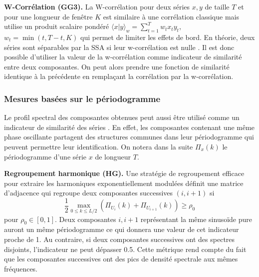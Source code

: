 \documentclass{gretsi}
\begin{document}
\noindent\textbf{W-Corrélation (GG3).}\label{par:GG3} 
    La W-corrélation pour deux séries $x, y$ de taille $T$ et pour une longueur de fenêtre $K$ est similaire à une corrélation classique mais utilise un produit scalaire pondéré $\langle x|y\rangle_w = \sum_{t=1}^Tw_t x_t y_t$, $w_t = \min(t, T-t, K)$ qui permet de limiter les effets de bord.
    En théorie, deux séries sont séparables par la SSA si leur w-corrélation est nulle \cite{Golyandina_10_ssa}.
    Il est donc possible d'utiliser la valeur de la w-corrélation comme indicateur de similarité entre deux composantes.
    On peut alors prendre une fonction de similarité identique à la précédente en remplaçant la corrélation par la w-corrélation.

\subsubsection{Mesures basées sur le périodogramme}\label{ssub:per}
Le profil spectral des composantes obtenues peut aussi être utilisé comme un indicateur de similarité des séries \cite{Golyandina_10_ssa}.
En effet, les composantes contenant une même phase oscillante partagent des structures communes dans leur périodogramme qui peuvent permettre leur identification.
On notera dans la suite $\Pi_x(k)$ le périodogramme d'une série $x$ de longueur $T$.


\noindent\textbf{Regroupement harmonique (HG).}\label{par:HG}
    Une stratégie de regroupement efficace pour extraire les harmoniques exponentiellement modulées \cite{alexandrov_05_auto} définit une matrice d'adjacence qui regroupe deux composantes successives $(i, i+1)$ si 
    \begin{equation}
        \frac{1}{2}\max_{0\le k \le L/2}\left(\Pi_{U_i}(k) + \Pi_{U_{i+1}}(k)\right) \ge \rho_0 
    \end{equation}
    pour $\rho_0\in \left[0, 1\right]$.
    Deux composantes $i, i+1$ représentant la même sinusoïde pure auront un même périodogramme ce qui donnera une valeur de cet indicateur proche de 1.
    Au contraire, si deux composantes successives ont des spectres disjoints, l'indicateur ne peut dépasser 0.5.
    Cette métrique rend compte du fait que les composantes successives ont des pics de densité spectrale aux mêmes fréquences.
\end{document}
